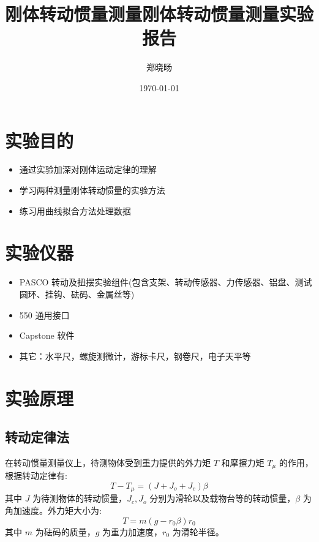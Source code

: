 \documentclass[UTF8]{ctexart}
\title{刚体转动惯量测量}
\title{刚体转动惯量测量实验报告}
\author{郑晓旸}
\date{\today}
\begin{document}
\fancyfoot[C]{\thepage}

\maketitle
\tableofcontents
\newpage

\section{实验目的}
    \begin{itemize}
        \item 通过实验加深对刚体运动定律的理解
        \item 学习两种测量刚体转动惯量的实验方法
        \item 练习用曲线拟合方法处理数据
    \end{itemize}

\section{实验仪器}
\begin{itemize}
    \item PASCO 转动及扭摆实验组件(包含支架、转动传感器、力传感器、铝盘、测试圆环、挂钩、砝码、金属丝等)
    \item 550 通用接口
    \item Capstone 软件
    \item 其它：水平尺，螺旋测微计，游标卡尺，钢卷尺，电子天平等
\end{itemize}

\section{实验原理}
\subsection{转动定律法}
在转动惯量测量仪上，待测物体受到重力提供的外力矩 \(T\) 和摩擦力矩 \(T_{\mu}\) 的作用，根据转动定律有:
\begin{equation}
T - T_{\mu} = (J + J_o + J_c) \beta
\end{equation}
其中 \(J\) 为待测物体的转动惯量，\(J_c, J_o\) 分别为滑轮以及载物台等的转动惯量，\(\beta\) 为角加速度。外力矩大小为:
\begin{equation}
T = m(g - r_0 \beta) r_0
\end{equation}
其中 \(m\) 为砝码的质量，\(g\) 为重力加速度，\(r_0\) 为滑轮半径。
\end{document}
